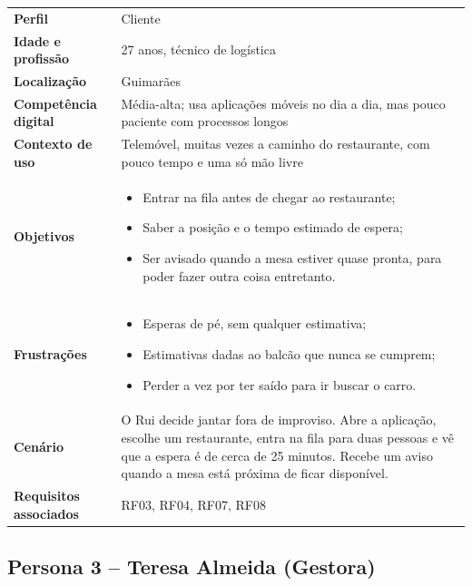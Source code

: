 \begin{tabularx}{\textwidth}{@{}>{\bfseries}p{3.4cm}X@{}}
\toprule
Perfil & Cliente \\
Idade e profissão & 27 anos, técnico de logística \\
Localização & Guimarães \\
Competência digital & Média-alta; usa aplicações móveis no dia a dia, mas pouco paciente com processos longos \\
Contexto de uso & Telemóvel, muitas vezes a caminho do restaurante, com pouco tempo e uma só mão livre \\
\midrule
Objetivos &
\begin{itemize}[nosep,leftmargin=*]
  \item Entrar na fila antes de chegar ao restaurante;
  \item Saber a posição e o tempo estimado de espera;
  \item Ser avisado quando a mesa estiver quase pronta, para poder fazer outra coisa entretanto.
\end{itemize} \\
Frustrações &
\begin{itemize}[nosep,leftmargin=*]
  \item Esperas de pé, sem qualquer estimativa;
  \item Estimativas dadas ao balcão que nunca se cumprem;
  \item Perder a vez por ter saído para ir buscar o carro.
\end{itemize} \\
Cenário &
O Rui decide jantar fora de improviso. Abre a aplicação, escolhe um restaurante, entra na fila para duas pessoas e vê que a espera é de cerca de 25 minutos. Recebe um aviso quando a mesa está próxima de ficar disponível. \\
Requisitos associados & RF03, RF04, RF07, RF08 \\
\bottomrule
\end{tabularx}
 
\subsection{Persona 3 -- Teresa Almeida (Gestora)}
 
